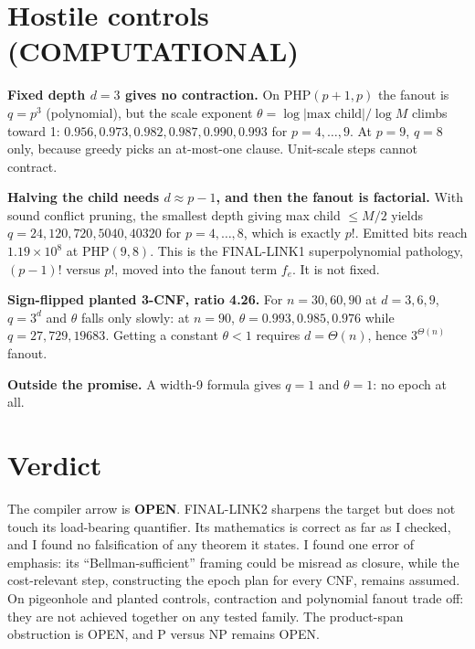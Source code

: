 \documentclass[11pt]{article}
\begin{document}
\section{Hostile controls (COMPUTATIONAL)}
\textbf{Fixed depth $d=3$ gives no contraction.} On PHP$(p+1,p)$ the fanout is $q=p^3$ (polynomial), but the scale exponent $\theta=\log|\text{max child}|/\log M$ climbs toward 1: $0.956, 0.973, 0.982, 0.987, 0.990, 0.993$ for $p=4,\dots,9$. At $p=9$, $q=8$ only, because greedy picks an at-most-one clause. Unit-scale steps cannot contract.

\textbf{Halving the child needs $d\approx p-1$, and then the fanout is factorial.} With sound conflict pruning, the smallest depth giving max child $\le M/2$ yields $q=24,120,720,5040,40320$ for $p=4,\dots,8$, which is exactly $p!$. Emitted bits reach $1.19\times10^8$ at PHP$(9,8)$. This is the FINAL-LINK1 superpolynomial pathology, $(p-1)!$ versus $p!$, moved into the fanout term $f_e$. It is not fixed.

\textbf{Sign-flipped planted 3-CNF, ratio 4.26.} For $n=30,60,90$ at $d=3,6,9$, $q=3^d$ and $\theta$ falls only slowly: at $n=90$, $\theta=0.993, 0.985, 0.976$ while $q=27, 729, 19683$. Getting a constant $\theta<1$ requires $d=\Theta(n)$, hence $3^{\Theta(n)}$ fanout.

\textbf{Outside the promise.} A width-9 formula gives $q=1$ and $\theta=1$: no epoch at all.

\section{Verdict}
The compiler arrow is \textbf{OPEN}. FINAL-LINK2 sharpens the target but does not touch its load-bearing quantifier. Its mathematics is correct as far as I checked, and I found no falsification of any theorem it states. I found one error of emphasis: its ``Bellman-sufficient'' framing could be misread as closure, while the cost-relevant step, constructing the epoch plan for every CNF, remains assumed. On pigeonhole and planted controls, contraction and polynomial fanout trade off: they are not achieved together on any tested family. The product-span obstruction is OPEN, and P versus NP remains OPEN.
\end{document}
